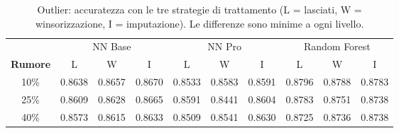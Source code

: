 \begin{table}[H]\centering\small
\setlength{\tabcolsep}{4pt}
\caption{Outlier: accuratezza con le tre strategie di trattamento (L = lasciati, W = winsorizzazione, I = imputazione). Le differenze sono minime a ogni livello.}\label{tab:outstrategie}
\begin{tabular}{c ccc ccc ccc}
\toprule
 & \multicolumn{3}{c}{NN Base} & \multicolumn{3}{c}{NN Pro} & \multicolumn{3}{c}{Random Forest}\\
\cmidrule(lr){2-4}\cmidrule(lr){5-7}\cmidrule(lr){8-10}
\textbf{Rumore} & L & W & I & L & W & I & L & W & I \\
\midrule
10\% & 0.8638 & 0.8657 & 0.8670 & 0.8533 & 0.8583 & 0.8591 & 0.8796 & 0.8788 & 0.8783 \\
25\% & 0.8609 & 0.8628 & 0.8665 & 0.8591 & 0.8441 & 0.8604 & 0.8783 & 0.8751 & 0.8738 \\
40\% & 0.8573 & 0.8615 & 0.8633 & 0.8509 & 0.8541 & 0.8630 & 0.8725 & 0.8736 & 0.8738 \\
\bottomrule
\end{tabular}
\end{table}
